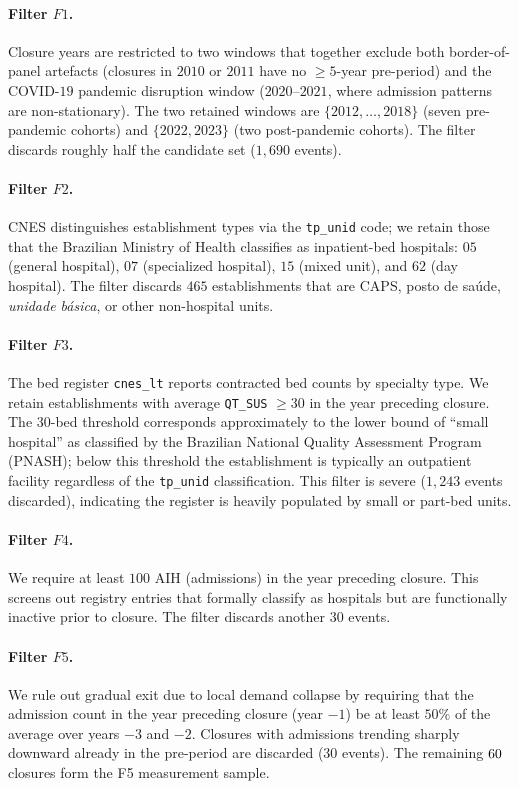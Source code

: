 \paragraph{Filter $F1$.} Closure years are restricted to two windows that
together exclude both border-of-panel artefacts (closures in $2010$ or
$2011$ have no $\geq 5$-year pre-period) and the COVID-$19$ pandemic
disruption window ($2020$--$2021$, where admission patterns are
non-stationary). The two retained windows are $\{2012, \ldots, 2018\}$
(seven pre-pandemic cohorts) and $\{2022, 2023\}$ (two post-pandemic
cohorts). The filter discards roughly half the candidate set
($1{,}690$ events).

\paragraph{Filter $F2$.} CNES distinguishes establishment types via the
\texttt{tp\_unid} code; we retain those that the Brazilian Ministry of
Health classifies as inpatient-bed hospitals: $05$ (general hospital),
$07$ (specialized hospital), $15$ (mixed unit), and $62$ (day hospital).
The filter discards $465$ establishments that are CAPS, posto de saúde,
\textit{unidade básica}, or other non-hospital units.

\paragraph{Filter $F3$.} The bed register \texttt{cnes\_lt} reports
contracted bed counts by specialty type. We retain establishments with
average \texttt{QT\_SUS} $\geq 30$ in the year preceding closure. The
$30$-bed threshold corresponds approximately to the lower bound of
``small hospital'' as classified by the Brazilian National Quality
Assessment Program (PNASH); below this threshold the establishment is
typically an outpatient facility regardless of the \texttt{tp\_unid}
classification. This filter is severe ($1{,}243$ events discarded),
indicating the register is heavily populated by small or part-bed
units.

\paragraph{Filter $F4$.} We require at least $100$ AIH (admissions) in
the year preceding closure. This screens out registry entries that
formally classify as hospitals but are functionally inactive prior to
closure. The filter discards another $30$ events.

\paragraph{Filter $F5$.} We rule out gradual exit due to local demand
collapse by requiring that the admission count in the year preceding
closure (year $-1$) be at least $50\%$ of the average over years $-3$
and $-2$. Closures with admissions trending sharply downward already
in the pre-period are discarded ($30$ events). The remaining $60$ closures form the F5 measurement sample.

